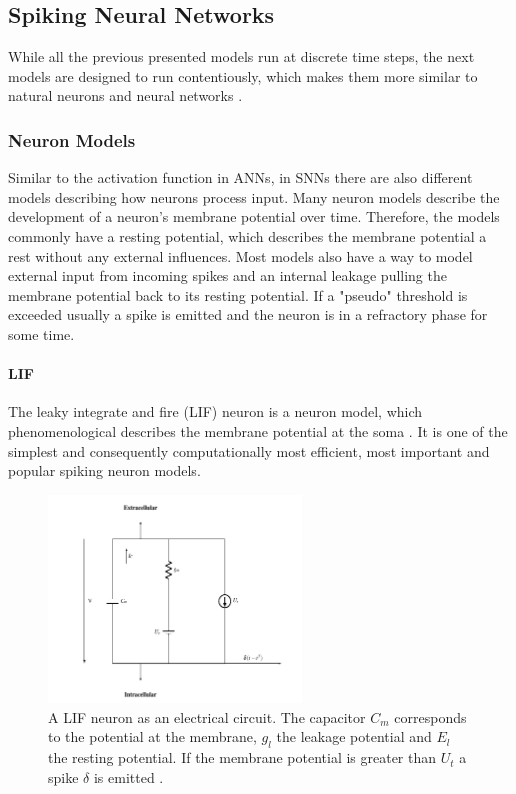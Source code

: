 \subsection{Spiking Neural Networks} \label{c:snns}

While all the previous presented models run at discrete time steps, the next models are designed to run contentiously, which makes them more similar to natural neurons and neural networks \cite{maass1997networks}. 

\subsubsection{Neuron Models} \label{c:snnneurons}

Similar to the activation function in ANNs, in SNNs there are also different models describing how neurons process input.
Many neuron models describe the development of a neuron's membrane potential over time.
Therefore, the models commonly have a resting potential, which describes the membrane potential a rest without any external influences. 
Most models also have a way to model external input from incoming spikes and an internal leakage pulling the membrane potential back to its resting potential. 
If a "pseudo" threshold is exceeded usually a spike is emitted and the neuron is in a refractory phase for some time.

\paragraph{LIF} \label{c:lif}

The leaky integrate and fire (LIF) neuron is a neuron model, which phenomenological describes the membrane potential at the soma \cite{abbott1999lapicque}\cite{gerstner2014neuronal}\cite{Petrovici2016}. 
It is one of the simplest and consequently computationally most efficient, most important and popular spiking neuron models.  

\begin{figure}
	\centering
    	\includegraphics[width=0.6\textwidth]{imgs/lif.png} 
    \caption[A LIF neuron as an electrical circuit.]{A LIF neuron as an electrical circuit. The capacitor $C_m$ corresponds to the potential at the membrane, $g_l$ the leakage potential and $E_l$ the resting potential. If the membrane potential is greater than $U_t$ a spike $\delta$ is emitted \cite{heikoMA}.}
	\label{fig:lif}
\end{figure}

